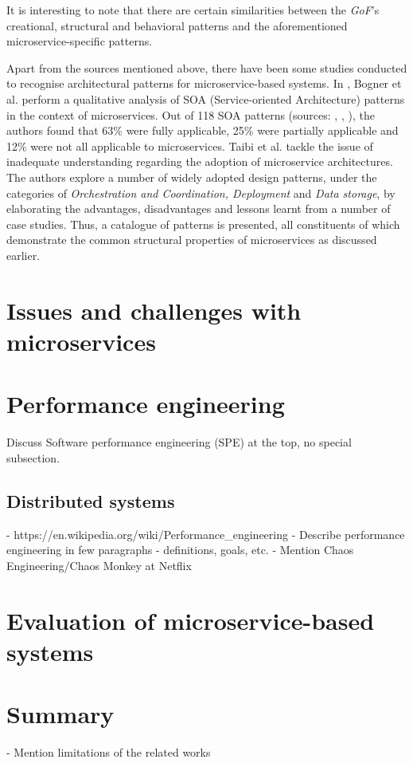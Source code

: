 It is interesting to note that there are certain similarities between the \textit{GoF}'s creational, structural and behavioral patterns \cite{gof94} and the aforementioned microservice-specific patterns. \linebreak

Apart from the sources mentioned above, there have been some studies conducted to recognise architectural patterns for microservice-based systems. In \cite{bogner18}, Bogner et al. perform a qualitative analysis of SOA (Service-oriented Architecture) patterns in the context of microservices. Out of 118 SOA patterns (sources: \cite{erl09}, \cite{erl12}, \cite{rotem12}), the authors found that 63\% were fully applicable, 25\% were partially applicable and 12\% were not all applicable to
microservices. Taibi et al. \cite{taibi18} tackle the issue of inadequate understanding regarding the adoption of microservice architectures. The authors explore a number of widely adopted design patterns, under the categories of \textit{Orchestration and Coordination, Deployment} and \textit{Data storage}, by elaborating the advantages, disadvantages and lessons learnt from a number of case studies. Thus, a catalogue of patterns is presented, all constituents of which demonstrate the common structural properties of microservices as discussed earlier.

\section{Issues and challenges with microservices}

\section{Performance engineering}

Discuss Software performance engineering (SPE) at the top, no special subsection.

\subsection{Distributed systems}

- https://en.wikipedia.org/wiki/Performance\_engineering
- Describe performance engineering in few paragraphs - definitions, goals, etc.
- Mention Chaos Engineering/Chaos Monkey at Netflix

\section{Evaluation of microservice-based systems}

\section{Summary}

- Mention limitations of the related works
